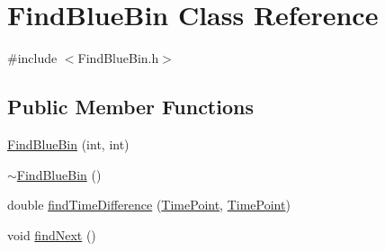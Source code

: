 \hypertarget{classFindBlueBin}{}\section{Find\+Blue\+Bin Class Reference}
\label{classFindBlueBin}


{\ttfamily \#include $<$Find\+Blue\+Bin.\+h$>$}

\subsection*{Public Member Functions}
\begin{DoxyCompactItemize}
\item 
\hyperlink{classFindBlueBin_a15529364387c5c3f901b6adeb4d23534}{Find\+Blue\+Bin} (int, int)
\item 
\hyperlink{classFindBlueBin_a616687b3a366380ca736bd606d4609ac}{$\sim$\+Find\+Blue\+Bin} ()
\item 
double \hyperlink{classFindBlueBin_a72f533d6fbce5872c5fa20260c3192bc}{find\+Time\+Difference} (\hyperlink{thruster__driver_8cpp_ad3e807c387dc076de974ff7eac67ad81}{Time\+Point}, \hyperlink{thruster__driver_8cpp_ad3e807c387dc076de974ff7eac67ad81}{Time\+Point})
\item 
void \hyperlink{classFindBlueBin_a136cd022a0ebacfb92ebf5c650c1019f}{find\+Next} ()
\end{DoxyCompactItemize}
